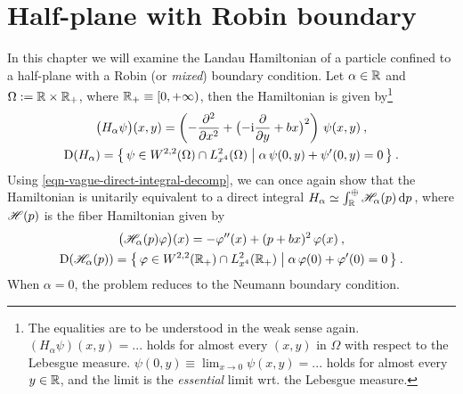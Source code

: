 \chapter{Half-plane with Robin boundary} \label{chapter-robin}
In this chapter we will examine the Landau Hamiltonian of a particle confined to a half-plane with a Robin (or \textit{mixed}) boundary condition. Let $\alpha \in \mathbb{R}$ and $\Omega := \mathbb{R} \times \mathbb{R}_+$, where $\mathbb{R}_+ \equiv [0, +\infty)$, then the Hamiltonian is given by\footnote{
    The equalities are to be understood in the weak sense again. $(H_\alpha \psi)(x, y) = ...$ holds for almost every $(x,y)$ in $\Omega$ with respect to the Lebesgue measure. $\psi(0,y) \equiv \lim_{x \to 0} \psi(x,y) = ...$ holds for almost every $y\in\mathbb{R}$, and the limit is the \textit{essential} limit wrt. the Lebesgue measure.
}
\begin{equation}
    \begin{gathered}
        \big( H_\alpha \psi \big)(x,y)
        = \left(
            -\frac{\partial ^2}{\partial x^2} +
            \big( {-\mathrm{i}} \frac{\partial }{\partial y} + bx \big)^2
        \right) \, \psi(x,y) \: ,
        \\
        \mathrm{D}(H_\alpha)
        = \big\{ \,
            \psi \in W^{2,2}(\Omega) \cap L^2_{x^4}(\Omega)
            \; \big| \;
            \alpha \, \psi(0,y) + \psi'(0,y) = 0
        \, \big\} \: .
    \end{gathered}
\end{equation}
Using \eqref{eqn-vague-direct-integral-decomp}, we can once again show that the Hamiltonian is unitarily equivalent to a direct integral $H_\alpha \simeq \int^\oplus_{\mathbb{R}} \mathscr{H}_\alpha(p) \, \mathrm{d}p \,$, where $\mathscr{H}(p)$ is the fiber Hamiltonian given by
\begin{equation}
    \begin{gathered}
        \big( \mathscr{H}_\alpha(p) \varphi \big)(x)
        = -\varphi''(x) + (p + bx)^2 \, \varphi(x) \: ,
        \\
        \mathrm{D}( \mathscr{H}_\alpha(p) )
        = \big\{ \,
            \varphi \in W^{2,2}(\mathbb{R}_+) \cap L^2_{x^4}(\mathbb{R}_+)
            \; \big| \;
            \alpha \, \varphi(0) + \varphi'(0) = 0
        \, \big\} \: .
    \end{gathered}
\end{equation}
When $\alpha=0$, the problem reduces to the Neumann boundary condition.



